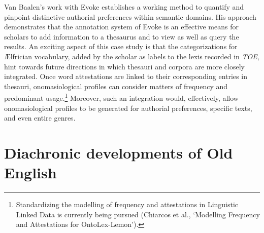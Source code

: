 Van Baalen's work with Evoke establishes a working method to quantify and pinpoint distinctive authorial preferences within semantic domains. His approach demonstrates that the annotation system of Evoke is an effective means for scholars to add information to a thesaurus and to view as well as query the results. An exciting aspect of this case study is that the categorizations for Ælfrician vocabulary, added by the scholar as labels to the lexis recorded in \textit{TOE}, hint towards future directions in which thesauri and corpora are more closely integrated. Once word attestations are linked to their corresponding entries in thesauri, onomasiological profiles can consider matters of frequency and predominant usage.\footnote{Standardizing the modelling of frequency and attestations in Linguistic Linked Data is currently being pursued (Chiarcos et al., `Modelling Frequency and Attestations for OntoLex-Lemon').} %
Moreover, such an integration would, effectively, allow onomasiological profiles to be generated for authorial preferences, specific texts, and even entire genres.

\section{Diachronic developments of Old English}
\label{sect:Stolk2021x:cs-diachronic}

